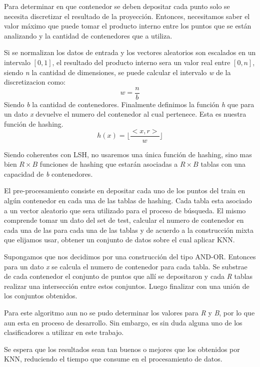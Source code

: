 Para determinar en que contenedor se deben depositar cada punto solo se necesita discretizar el resultado de la proyección. Entonces, necesitamos saber el valor máximo que puede tomar el producto interno entre los puntos que se están analizando y la cantidad de contenedores que a utiliza.

Si se normalizan los datos de entrada y los vectores aleatorios son escalados en un intervalo $ [0,1] $, el resultado del producto interno sera un valor real entre $ [0,n] $, siendo \textit{n} la cantidad de dimensiones, se puede calcular el intervalo \textit{w} de la discretizacion como:
\[ w = \frac{n}{b} \]
Siendo \textit{b} la cantidad de contenedores. Finalmente definimos la función \textit{h} que para un dato \textit{x} devuelve el numero del contenedor al cual pertenece. Esta es nuestra función de hashing.
\[ h(x) = \lfloor \frac{<x,r>}{w} \rfloor  \]

Siendo coherentes con LSH, no usaremos una única función de hashing, sino mas bien $ R \times B $ funciones de hashing que estarán asociadas a $ R\times B $ tablas con una capacidad de \textit{b} contenedores.

El pre-procesamiento consiste en depositar cada uno de los puntos del train en algún contenedor en cada una de las tablas de hashing. Cada tabla esta asociado a un vector aleatorio que sera utilizado para el proceso de búsqueda. El mismo comprende tomar un dato del set de test, calcular el numero de contenedor en cada una de las para cada una de las tablas y de acuerdo a la construcción mixta que elijamos usar, obtener un conjunto de datos sobre el cual aplicar KNN. 

Supongamos que nos decidimos por una construcción del tipo AND-OR. Entonces para un dato \textit{x} se calcula el numero de contenedor para cada tabla. Se substrae de cada contenedor el conjunto de puntos que allí se depositaron y cada \textit{R} tablas realizar una intersección entre estos conjuntos. Luego finalizar con una unión de los conjuntos obtenidos.

Para este algoritmo aun no se pudo determinar los valores para \textit{R} y \textit{B}, por lo que aun esta en proceso de desarrollo. Sin embargo, es sin duda alguna uno de los clasificadores a utilizar en este trabajo.

Se espera que los resultados sean tan buenos o mejores que los obtenidos por KNN, reduciendo el tiempo que consume en el procesamiento de datos. 

